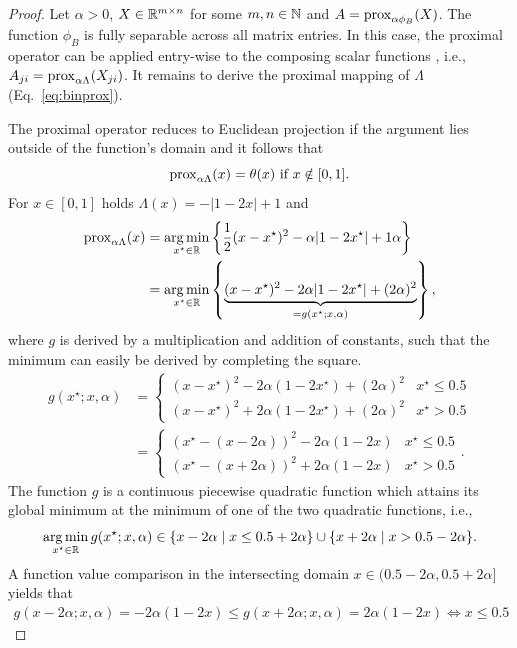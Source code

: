 \begin{proof}
Let $\alpha>0$, $X\in\mathbb{R}^{m\times n}$ for some $m,n\in\mathbb{N}$ and $A=\operatorname{prox}_{\alpha\phi_B}(X)$. The function $\phi_B$ is fully separable across all matrix entries. In this case, the proximal operator can be applied entry-wise to the composing scalar functions \citep{parikh2014proximal}, i.e., $A_{ji}=\operatorname{prox}_{\alpha\Lambda}(X_{ji})$. It remains to derive the proximal mapping of $\Lambda$ (Eq.~\eqref{eq:binprox}).

The proximal operator reduces to Euclidean projection if the argument lies outside of the function's domain \citep{parikh2014proximal} and it follows that
\[\operatorname{prox}_{\alpha\Lambda}(x)=\theta(x) \text{ if } x\notin[0,1].\]
For $x\in[0,1]$ holds $\Lambda(x)=-|1-2x|+1$ and
\begin{align*}
  \operatorname{prox}_{\alpha\Lambda}(x) &= \operatorname*{arg\,min}_{x^\star\in\mathbb{R}} \left\{\frac{1}{2}(x-x^\star)^2-\alpha|1-2x^\star| +1\alpha\right\}\\
  &= \operatorname*{arg\,min}_{x^\star\in\mathbb{R}} \left\{\underbrace{(x-x^\star)^2-2\alpha|1-2x^\star| +(2\alpha)^2}_{=g(x^\star;x,\alpha)}\right\},
\end{align*}
where $g$ is derived by a multiplication and addition of constants, such that the minimum can easily be derived by completing the square.
\begin{align*}
  g(x^\star;x,\alpha) &=\begin{cases}
    (x-x^\star)^2  -2\alpha(1-2 x^\star) +(2\alpha)^2 & x^\star \leq 0.5\\
    (x-x^\star)^2 +2\alpha(1-2 x^\star) +(2\alpha)^2 & x^\star> 0.5
  \end{cases}\\
  &=
  \begin{cases}
    (x^\star-(x-2\alpha))^2 -2\alpha( 1-2x)& x^\star \leq 0.5\\
    (x^\star-(x+2\alpha))^2 +2\alpha( 1-2x) & x^\star> 0.5
  \end{cases}.
\end{align*}
The function $g$ is a continuous piecewise quadratic function which attains its global minimum at the minimum of one of the two quadratic functions, i.e.,
\[
  \operatorname*{arg\,min}_{x^\star\in\mathbb{R}}g(x^\star;x,\alpha) \in \{x-2\alpha\mid x\leq 0.5+2\alpha\}\cup \{x+2\alpha\mid x> 0.5-2\alpha\}.
\] 
A function value comparison in the intersecting domain $x\in(0.5-2\alpha,0.5+2\alpha]$ yields that
\begin{align*}
g(x-2\alpha;x,\alpha)=-2\alpha(1-2x)\leq g(x+2\alpha;x,\alpha) =2\alpha(1-2x) \Leftrightarrow x\leq 0.5
\end{align*}
\end{proof}
